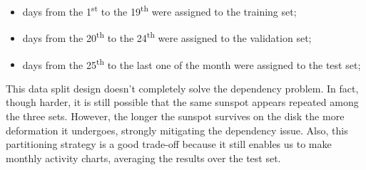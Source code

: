 \begin{itemize}
  \item days from the 1\textsuperscript{st} to the 19\textsuperscript{th} were assigned to the training set;
  \item days from the 20\textsuperscript{th} to the 24\textsuperscript{th} were assigned to the validation set;
  \item days from the 25\textsuperscript{th} to the last one of the month were assigned to the test set;
\end{itemize}
This data split design doesn't completely solve the dependency problem. In fact, though harder, it is still possible that the same sunspot appears repeated among the three sets. However, the longer the sunspot survives on the disk the more deformation it undergoes, strongly mitigating the dependency issue. Also, this partitioning strategy is a good trade-off because it still enables us to make monthly activity charts, averaging the results over the test set.
\clearpage
